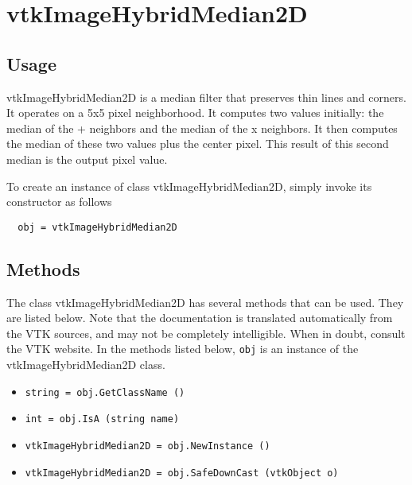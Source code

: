 \section{vtkImageHybridMedian2D}

\subsection{Usage}

 vtkImageHybridMedian2D is a median filter that preserves thin lines and
 corners.  It operates on a 5x5 pixel neighborhood.  It computes two values
 initially: the median of the + neighbors and the median of the x
 neighbors.  It then computes the median of these two values plus the center
 pixel.  This result of this second median is the output pixel value.

To create an instance of class vtkImageHybridMedian2D, simply
invoke its constructor as follows
\begin{verbatim}
  obj = vtkImageHybridMedian2D
\end{verbatim}
\subsection{Methods}

The class vtkImageHybridMedian2D has several methods that can be used.
  They are listed below.
Note that the documentation is translated automatically from the VTK sources,
and may not be completely intelligible.  When in doubt, consult the VTK website.
In the methods listed below, \verb|obj| is an instance of the vtkImageHybridMedian2D class.
\begin{itemize}
\item  \verb|string = obj.GetClassName ()|

\item  \verb|int = obj.IsA (string name)|

\item  \verb|vtkImageHybridMedian2D = obj.NewInstance ()|

\item  \verb|vtkImageHybridMedian2D = obj.SafeDownCast (vtkObject o)|

\end{itemize}
